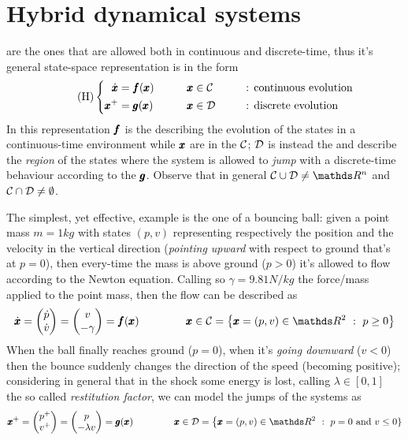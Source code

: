 \chapter{Hybrid dynamical systems}
	 are the ones that are allowed both in continuous and discrete-time, thus it's general state-space representation is in the form
	\begin{equation} \tag{H}
	\left\{\begin{aligned}
		\dot{\pmb{x}} &  = \pmb{f}(\pmb{x}) \qquad &&\pmb{x} \in \mathcal C \qquad &&  \textrm{: continuous evolution} \\
		\pmb{x}^+ & = \pmb{g}(\pmb{x}) \qquad &&\pmb{x} \in \mathcal D && \textrm{: discrete evolution}
	\end{aligned} \right.
	\end{equation}
	In this representation $\pmb{f}$ is the  describing the evolution of the states in a continuous-time environment while $\pmb{x}$ are in the  $\mathcal C$; $\mathcal D$ is instead the  and describe the \textit{region} of the states where the system is allowed to \textit{jump} with a discrete-time behaviour according to the  $\pmb{g}$. Observe that in general $\fset \cup \jset \neq \mathds R^n$ and $\mathcal C \cap \mathcal D \neq \emptyset$.
	
	The simplest, yet effective, example is the one of a bouncing ball: given a point mass $m=1kg$ with states $(p,v)$ representing respectively the position and the velocity in the vertical direction (\textit{pointing upward} with respect to ground that's at $p=0$), then every-time the mass is above ground ($p>0$) it's allowed to flow according to the Newton equation. Calling so $\gamma =9.81N/kg$ the force/mass applied to the point mass, then the flow can be described as
	\[ \dx = \vector{\dot p \\ \dot v} = \vector{v \\ -\gamma} = \vet f(\x) \hspace{1.5cm} \x \in \fset = \big\{ \x = (p,v) \in \mathds R^2 \ : \ p \geq  0 \big\} \]
	When the ball finally reaches ground ($p=0$), when it's \textit{going downward} ($v<0$) then the bounce suddenly changes the direction of the speed (becoming positive); considering in general that in the shock some energy is lost, calling $\lambda \in [0,1]$ the so called \textit{restitution factor}, we can model the jumps of  the systems as
	\[ \xp = \vector{p^+ \\ v^+} = \vector{p \\ - \lambda v} = \vet g(\x) \hspace{1.5cm} \x \in \jset = \big\{ \x = (p,v) \in \mathds R^2 \ : \ p = 0 \textrm{ and } v \leq 0 \} \]
	
